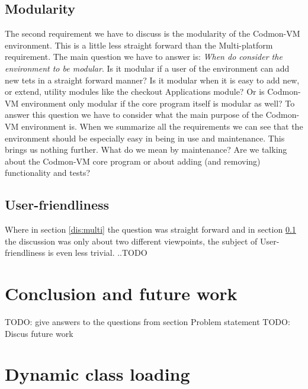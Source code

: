 \documentclass{article}
\newcommand{\project}{Codmon-VM}
\begin{document}
\subsection{Modularity}
\label{dis:modular}
The second requirement we have to discuss is the modularity of the \project{} environment. This is a little less straight forward than the Multi-platform requirement. The main question we have to answer is: 
\emph{When do consider the environment to be modular}. Is it modular if a user of the environment can add new tets in a straight forward manner? Is it modular when it is easy to add new, or extend, utility 
modules like the checkout Applications module? Or is \project{} environment only modular if the core program itself is modular as well? To answer this question we have to consider what the main purpose of the 
\project{} environment is. When we summarize all the requirements we can see that the environment should be especially easy in being in use and maintenance. This brings us nothing further. What do we mean by 
maintenance? Are we talking about the \project{} core program or about adding (and removing) functionality and tests? 

\subsection{User-friendliness}
\label{dis:user}
Where in section \ref{dis:multi} the question was straight forward and in section \ref{dis:modular} the discussion was only about two different viewpoints, the subject of User-friendliness is even less trivial. 
..TODO

\newpage
\section{Conclusion and future work}
\label{sec:conclusion}
TODO: give answers to the questions from section Problem statement
TODO: Discus future work
\newpage


\newpage
\appendix
\section{Dynamic class loading}
\label{AppendixA}
\end{document}
